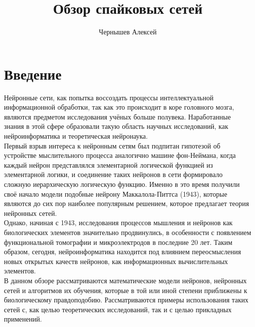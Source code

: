 \documentclass[a4paper,10pt]{article}
\title{Обзор спайковых сетей}
\author{Чернышев Алексей}
\begin{document}


\tableofcontents
\clearpage
\section{Введение}
\indent Нейронные сети, как попытка воссоздать процессы интеллектуальной информационной обработки, так как это происходит в коре головного мозга, являются предметом исследования учёных больше полувека. Наработанные знания в этой сфере образовали такую область научных исследований, как нейроинформатика и теоретическая нейронаука.\\
\indent Первый взрыв интереса к нейронным сетям был подпитан гипотезой об устройстве мыслительного процесса аналогично машине фон-Неймана, когда каждый нейрон представлялся элементарной логической функцией из элементарной логики, и соединение таких нейронов в сети формировало сложную иерархическую логическую функцию. Именно в это время получили своё начало модели подобные нейрону Маккалола-Питтса (1943), которые являются до сих пор наиболее популярным решением, которое предлагает теория нейронных сетей.\\
\indent Однако, начиная с 1943, исследования процессов мышления и нейронов как биологических элементов значительно продвинулись, в особенности с появлением функциональной томографии и микроэлектродов в последние 20 лет. Таким образом, сегодня, нейроинформатика находится под влиянием переосмысления новых открытых качеств нейронов\cite{BohteReview}, как информационных вычислительных элементов.\\
\indent В данном обзоре рассматриваются математические модели нейронов, нейронных сетей и алгоритмов их обучения, которые в той или иной степени приближены к биологическому правдоподобию. Рассматриваются примеры использования таких сетей с, как целью теоретических исследований, так и с целью прикладных применений.\\
\end{document}
